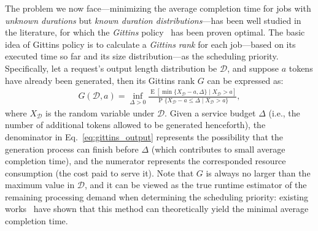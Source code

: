The problem we now face---minimizing the average completion time for jobs with \emph{unknown durations} but \emph{known duration distributions}---has been well studied in the literature, for which the \emph{Gittins} policy~\cite{gittins2011multi, aalto2009gittins, scully2021gittins} has been proven optimal.
The basic idea of Gittins policy is to calculate a \emph{Gittins rank} for each job---based on its executed time so far and its size distribution---as the scheduling priority.
Specifically, let a request's output length distribution be $\mathcal{D}$, and suppose $a$ tokens have already been generated,
then its Gittins rank $G$ can be expressed as:
\begin{equation}
\label{eq:gittins_output}
    \begin{aligned}
    G(\mathcal{D},a) = \operatorname*{inf}_{\Delta>0}{\frac{\operatorname{E}[\operatorname*{min}\{X_{\mathcal{D}}-a,\Delta\}\mid X_{\mathcal{D}}>a]}{\operatorname*{P}\{X_{\mathcal{D}}-a\leq\Delta\mid X_{\mathcal{D}}>a\}}},
    \end{aligned}
\end{equation}
where $X_\mathcal{D}$ is the random variable under $\mathcal{D}$.
Given a service budget $\Delta$ (i.e., the number of additional tokens allowed to be generated henceforth), the denominator in Eq.~\ref{eq:gittins_output} represents the possibility that the generation process can finish before $\Delta$ (which contributes to small average completion time), and the numerator represents the corresponded resource consumption (the cost paid to serve it). 
Note that $G$ is always no larger than the maximum value in $\mathcal{D}$, and it can be viewed as the true runtime estimator of the remaining processing demand when determining the scheduling priority:
existing works~\cite{gittins2011multi, scully2021gittins} have shown that this method can theoretically yield the minimal average completion time.
